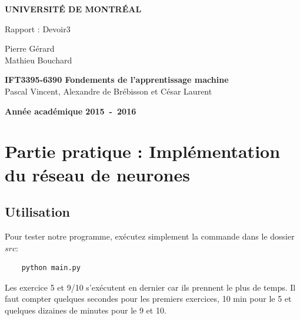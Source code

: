 \documentclass[a4paper,11pt]{article}
\begin{document}
\begin{titlepage}
\begin{center}
\textbf{\textsc{UNIVERSIT\'E DE MONTR\'EAL}}\\
\vfill{}\vfill{}
\begin{center}{\Huge Rapport : Devoir3 }\end{center}{\Huge \par}
\begin{center}{\large Pierre Gérard \\ Mathieu Bouchard}\end{center}{\Huge \par}
\vfill{}\vfill{} \vfill{}
\begin{center}{\large \textbf{IFT3395-6390 Fondements de l'apprentissage machine}}\hfill{\\Pascal Vincent, Alexandre de Brébisson et César Laurent}\end{center}{\large\par}
\vfill{}\vfill{}\enlargethispage{3cm}
\textbf{Année académique 2015~-~2016}
\end{center}
\end{titlepage}





\section{Partie pratique : Implémentation du réseau de neurones}

\subsection{Utilisation}

Pour tester notre programme, exécutez simplement la commande dans le dossier $src$:

\begin{verbatim}
	python main.py
\end{verbatim}

Les exercice 5 et 9/10 s'exécutent en dernier car ils prennent le plus de temps. Il faut compter quelques secondes pour les premiers exercices, 10 min pour le 5 et quelques dizaines de minutes pour le 9 et 10.
\end{document}
